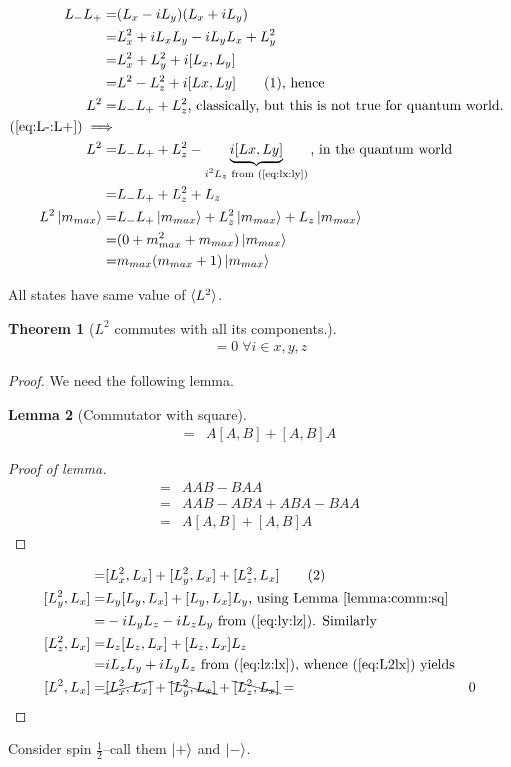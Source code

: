 \documentclass[]{article}
\newcommand\numberthis{\addtocounter{equation}{1}\tag{\theequation}}
\newtheorem{thm}{Theorem}
\newtheorem{lemma}[thm]{Lemma}
\begin{document}
\begin{align*}
	L_- L_+ =& (L_x-iL_y)(L_x+iL_y)\\
	=& L_x^2 +i L_x L_y -i L_y L_x + L_y^2\\
	=& L_x^2 + L_y^2 + i[L_x,L_y]\\
	=& L^2 - L_z^2 + i[Lx,Ly] \numberthis \label{eq:L-:L+}\text{, hence}\\
	L^2 =& L_- L_+ + L_z^2 \text{, classically, but this is not true for quantum world. }\\
	(\ref{eq:L-:L+}) \implies& \\
	 L^2 =& L_- L_+ + L_z^2 -\underbrace{i[Lx,Ly]}_\text{$i^2L_z$ from (\ref{eq:lx:ly})}\text{, in the quantum world}\\
	 =& L_- L_+ + L_z^2 +L_z\\
	L^2 \ket{m_{max}}=& L_- L_+ \ket{m_{max}} + L_z^2 \ket{m_{max}} +L_z \ket{m_{max}}\\
	=& (0 +m_{max}^2 + m_{max})\ket{m_{max}} \\
	=& m_{max} (m_{max}+1)\ket{m_{max}}
\end{align*}

All states have same value of $\braket{L^2}$. 

\begin{thm}[$L^2$ commutes with all its components.]
	 \begin{align*}
	 [L^2,L_i]=0  \;\forall i \in {x,y,z}
	 \end{align*}
\end{thm}
\begin{proof}
	We need the following lemma.
	\begin{lemma}[Commutator with square]\label{lemma:comm:sq}
		\begin{align*}
			[A^2,B] =& A[A,B] + [A,B]A
		\end{align*}
	\end{lemma}
	\begin{proof}[Proof of lemma]
		\begin{align*}
			[A^2,B] =& AAB - BAA\\
			=& AAB - ABA +ABA -BAA\\
			=& A[A,B] + [A,B]A
		\end{align*}
	\end{proof}
	\begin{align*}
	[L^2,L_x]=&[L_x^2,L_x] + [L_y^2,L_x] + [L_z^2,L_x] \numberthis \label{eq:L2lx}\\
	[L_y^2,L_x] =&L_y[L_y,L_x] + [L_y,L_x]L_y \text{, using Lemma \ref{lemma:comm:sq}}\\
	=& -i L_y L_z -i L_z L_y \text{ from (\ref{eq:ly:lz}). Similarly}\\
	[L_z^2,L_x] = &L_z [L_z,L_x] + [L_z,L_x] L_z\\
	=& i L_z L_y  + i L_y L_z \text{ from (\ref{eq:lz:lx}), whence (\ref{eq:L2lx}) yields}\\
	[L^2,L_x]=&\cancel{[L_x^2,L_x] }+\bcancel{ [L_y^2,L_x]} + \bcancel{[L_z^2,L_x]}
	=& 0
	\end{align*}
\end{proof}
Consider spin $\frac{1}{2}$--call them $\ket{+}$ and  $\ket{-}$.
\end{document}
